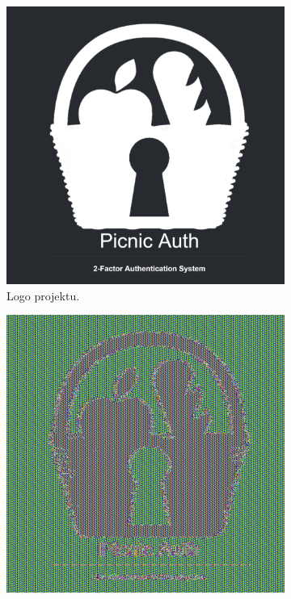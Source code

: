 \begin{figure}
    \centering
    \begin{subfigure}{0.3\textwidth}
        \includegraphics[width=\textwidth]{content/images/logo}
        \caption{Logo projektu.}
        \label{fig:logo}
    \end{subfigure}
    \begin{subfigure}{0.3\textwidth}
        \includegraphics[width=\textwidth]{content/images/logo-ecb}

\end{subfigure}
\end{figure}
